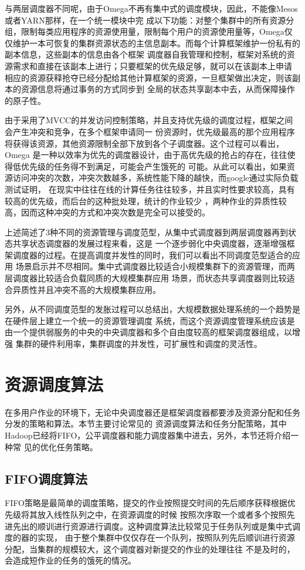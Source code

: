 与两层调度器不同呢，由于Omega不再有集中式的调度模块，因此，不能像Mesos或者YARN那样，在一个统一模块中完
成以下功能：对整个集群中的所有资源分组，限制每类应用程序的资源使用量，限制每个用户的资源使用量等，Omega仅
仅维护一本可恢复的集群资源状态的主信息副本。而每个计算框架维护一份私有的副本信息，这些副本的信息由各个框架
调度器自我管理和控制，框架对系统的资源需求和直接在该副本上进行；只要框架的优先级足够，就可以在该副本上申请
相应的资源获释抢夺已经分配给其他计算框架的资源，一旦框架做出决定，则该副本的资源信息将通过事务的方式同步到
全局的状态共享副本中去，从而保障操作的原子性。

由于采用了MVCC的并发访问控制策略，并且支持优先级的调度过程，框架之间会产生冲突和竞争，在多个框架申请同一
份资源时，优先级最高的那个应用程序将获得该资源，其他资源限制全部下放到各个子调度器。这个过程可以看出，Omega
是一种以效率为优先的调度器设计，由于高优先级的抢占的存在，往往使得低优先级的任务得不到满足，可能会产生饿死的
可能。从此可以看出，如果资源访问冲突的次数，冲突次数越多，系统性能下降的越快，而google通过实际负载测试证明，
在现实中往往在线的计算任务往往较多，并且实时性要求较高，具有较高的优先级，而后台的这种批处理，统计的作业较少
，两种作业的异质性较高，因而这种冲突的方式和冲突次数是完全可以接受的。

上述简述了3种不同的资源管理与调度范型，从集中式调度器到两层调度器再到状态共享状态调度器的发展过程来看，这是
一个逐步弱化中央调度器，逐渐增强框架调度器的过程。在提高调度并发性的同时，我们可以看出不同调度范型适合的应用
场景启示并不尽相同。集中式调度器比较适合小规模集群下的资源管理，而两层调度器比较适合负载同质的大规模集群应用
场景，而状态共享调度器则比较适合异质性并且冲突不高的大规模集群应用。

另外，从不同调度范型的发胀过程可以总结出，大规模数据处理系统的一个趋势是在硬件层上建立一个统一的资源管理调度
系统，而这个资源调度管理系统应该是由一个提供弱服务的中央的中央调度器和多个自由度较高的框架调度器组成，以增强
集群的硬件利用率，集群调度的并发性，可扩展性和调度的灵活性。

\section{资源调度算法}
 在多用户作业的环境下，无论中央调度器还是框架调度器都要涉及资源分配和任务分发的策略和算法。本节主要讨论常见的
 资源调度算法和任务分配策略，其中Hadoop已经将FIFO，公平调度器和能力调度器集中进去，另外，本节还将介绍一种常
 见的优化任务策略。
\subsection{FIFO调度算法}
FIFO策略是最简单的调度策略，提交的作业按照提交时间的先后顺序获释根据优先级将其放入线性队列之中，在资源调度的时候
按照次序取一个或者多个按照先进先出的顺训进行资源进行调度。这种调度算法比较常见于任务队列或是集中式调度的器的实现，
由于整个集群中仅仅存在一个队列，按照队列先后顺训进行资源分配，当集群的规模较大，这个调度器对新提交的作业的处理往往
不是及时的，会造成短作业的任务的饿死的情况。
